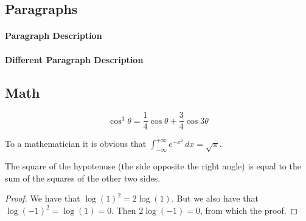 \documentclass[
10pt, %
a4paper, %
oneside, %
headinclude,footinclude, %
BCOR5mm, %
]{scrartcl}
\begin{document}

\subsection{Paragraphs}


\paragraph{Paragraph Description} %

\paragraph{Different Paragraph Description} %


\subsection{Math}


\begin{equation}
\cos^3 \theta =\frac{1}{4}\cos\theta+\frac{3}{4}\cos 3\theta
\label{eq:refname2}
\end{equation}


\begin{definition}[Gauss] 
To a mathematician it is obvious that
$\int_{-\infty}^{+\infty}
e^{-x^2}\,dx=\sqrt{\pi}$. 
\end{definition} 

\begin{theorem}[Pythagoras]
The square of the hypotenuse (the side opposite the right angle) is equal to the sum of the squares of the other two sides.
\end{theorem}

\begin{proof} 
We have that $\log(1)^2 = 2\log(1)$.
But we also have that $\log(-1)^2=\log(1)=0$.
Then $2\log(-1)=0$, from which the proof.
\end{proof}

\end{document}
